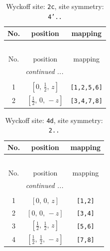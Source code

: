 \documentclass[fleqn,8pt]{jsarticle}
\begin{document}
\renewcommand{\arraystretch}{1.2}
\begin{longtable}{ccc}
\caption{Wyckoff site: {\tt 2c}, site symmetry: {\tt 4'..}}
 \\
 \hline \hline
No. & position & mapping \\ \hline \endfirsthead

\multicolumn{2}{l}{\tablename\ \thetable{}} \\
 \hline \hline
No. & position & mapping \\ \hline \endhead

 \hline \hline
\multicolumn{2}{r}{\footnotesize\it continued ...} \\ \endfoot

 \hline \hline
\multicolumn{2}{r}{} \\ \endlastfoot

1 & $\left[ 0,\, \frac{1}{2},\, z \right]$ & {\tt [1,2,5,6]} \\ \hline
2 & $\left[ \frac{1}{2},\, 0,\, - z \right]$ & {\tt [3,4,7,8]} \\
\end{longtable}
\renewcommand{\arraystretch}{1.2}
\begin{longtable}{ccc}
\caption{Wyckoff site: {\tt 4d}, site symmetry: {\tt 2..}}
 \\
 \hline \hline
No. & position & mapping \\ \hline \endfirsthead

\multicolumn{2}{l}{\tablename\ \thetable{}} \\
 \hline \hline
No. & position & mapping \\ \hline \endhead

 \hline \hline
\multicolumn{2}{r}{\footnotesize\it continued ...} \\ \endfoot

 \hline \hline
\multicolumn{2}{r}{} \\ \endlastfoot

1 & $\left[ 0,\, 0,\, z \right]$ & {\tt [1,2]} \\ \hline
2 & $\left[ 0,\, 0,\, - z \right]$ & {\tt [3,4]} \\ \hline
3 & $\left[ \frac{1}{2},\, \frac{1}{2},\, z \right]$ & {\tt [5,6]} \\ \hline
4 & $\left[ \frac{1}{2},\, \frac{1}{2},\, - z \right]$ & {\tt [7,8]} \\
\end{longtable}
\renewcommand{\arraystretch}{1.2}
\end{document}
